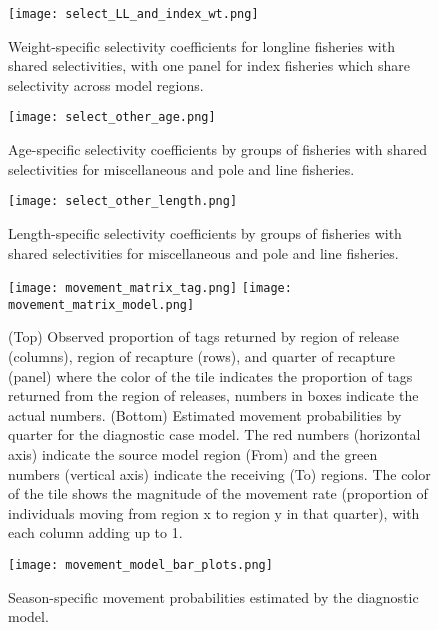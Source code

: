 \newpage
\begin{figure}[!ht]
  \centering
  \texttt{[image: select\_LL\_and\_index\_wt.png]}
  \caption{Weight-specific selectivity coefficients for longline fisheries with shared selectivities, with one panel for index fisheries which share selectivity across model regions. \label{fig:select_LL_and_index_wt}}
\end{figure}
\clearpage

\newpage
\begin{figure}[!ht]
  \centering
  \texttt{[image: select\_other\_age.png]}
  \caption{Age-specific selectivity coefficients by groups of fisheries with shared selectivities for miscellaneous and pole and line fisheries. \label{fig:select_other_age}}
\end{figure}
\clearpage

\newpage
\begin{figure}[!ht]
  \centering
  \texttt{[image: select\_other\_length.png]}
  \caption{Length-specific selectivity coefficients by groups of fisheries with shared selectivities for miscellaneous and pole and line fisheries. \label{fig:select_other_length}}
\end{figure}
\clearpage

\newpage
\begin{figure}[!ht]
  \centering
  \texttt{[image: movement\_matrix\_tag.png]}
  \texttt{[image: movement\_matrix\_model.png]}
  \caption{(Top) Observed proportion of tags returned by region of release (columns), region of recapture (rows), and quarter of recapture (panel) where the color of the tile indicates the proportion of tags returned from the region of releases, numbers in boxes indicate the actual numbers. (Bottom) Estimated movement probabilities by quarter for the diagnostic case model. The red numbers (horizontal axis) indicate the source model region (From) and the green numbers (vertical axis) indicate the receiving (To) regions. The color of the tile shows the magnitude of the movement rate (proportion of individuals moving from region x to region y in that quarter), with each column adding up to 1. \label{fig:movement_matrices}}
\end{figure}
\clearpage

\newpage
\begin{figure}[!ht]
  \centering
  \texttt{[image: movement\_model\_bar\_plots.png]}
  \caption{Season-specific movement probabilities estimated by the diagnostic model. \label{fig:season_movement_coeff}}
\end{figure}
\clearpage

